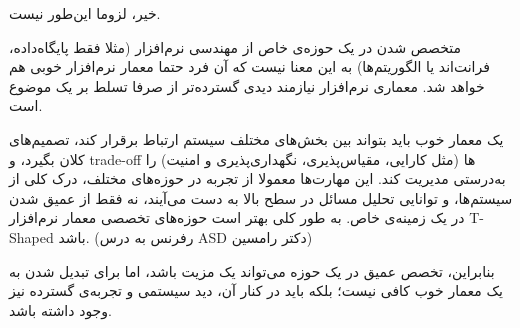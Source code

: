 خیر، لزوما این‌طور نیست.

متخصص شدن در یک حوزه‌ی خاص از مهندسی نرم‌افزار (مثلا فقط پایگاه‌داده، فرانت‌اند یا الگوریتم‌ها) به این معنا نیست که آن فرد حتما معمار نرم‌افزار خوبی هم خواهد شد. معماری نرم‌افزار نیازمند دیدی گسترده‌تر از صرفا تسلط بر یک موضوع است.

یک معمار خوب باید بتواند بین بخش‌های مختلف سیستم ارتباط برقرار کند، تصمیم‌های کلان بگیرد، و trade-off ها (مثل کارایی، مقیاس‌پذیری، نگهداری‌پذیری و امنیت) را به‌درستی مدیریت کند. این مهارت‌ها معمولا از تجربه در حوزه‌های مختلف، درک کلی از سیستم‌ها، و توانایی تحلیل مسائل در سطح بالا به دست می‌آیند، نه فقط از عمیق شدن در یک زمینه‌ی خاص. به طور کلی بهتر است حوزه‌های تخصصی معمار نرم‌افزار T-Shaped باشد. (رفرنس به درس ASD دکتر رامسین)

بنابراین، تخصص عمیق در یک حوزه می‌تواند یک مزیت باشد، اما برای تبدیل شدن به یک معمار خوب کافی نیست؛ بلکه باید در کنار آن، دید سیستمی و تجربه‌ی گسترده نیز وجود داشته باشد.

